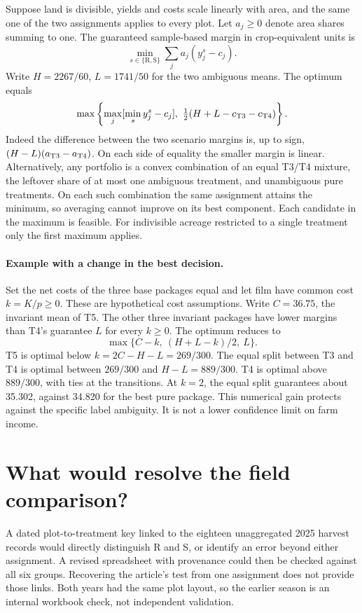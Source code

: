 \documentclass[11pt]{article}
\begin{document}
Suppose land is divisible, yields and costs scale linearly with area, and the same one of the two assignments applies to every plot. Let $a_j\geq0$ denote area shares summing to one. The guaranteed sample-based margin in crop-equivalent units is
\[
 \min_{s\in\{\mathrm R,\mathrm S\}}\sum_j a_j(y_j^s-c_j).
\]
Write $H=2267/60$, $L=1741/50$ for the two ambiguous means. The optimum equals
\[
 \max\left\{\max_j [\min_s y_j^s-c_j],\
              \tfrac12(H+L-c_{\rm T3}-c_{\rm T4})\right\}.
\]
Indeed the difference between the two scenario margins is, up to sign, $(H-L)(a_{\rm T3}-a_{\rm T4})$. On each side of equality the smaller margin is linear. Alternatively, any portfolio is a convex combination of an equal T3/T4 mixture, the leftover share of at most one ambiguous treatment, and unambiguous pure treatments. On each such combination the same assignment attains the minimum, so averaging cannot improve on its best component. Each candidate in the maximum is feasible. For indivisible acreage restricted to a single treatment only the first maximum applies.

\paragraph{Example with a change in the best decision.} Set the net costs of the three base packages equal and let film have common cost $k=K/p\geq0$. These are hypothetical cost assumptions. Write $C=36.75$, the invariant mean of T5. The other three invariant packages have lower margins than T4's guarantee $L$ for every $k\ge0$. The optimum reduces to
\[
   \max\{ C-k,\ (H+L-k)/2,\ L\}.
\]
T5 is optimal below $k=2C-H-L=269/300$. The equal split between T3 and T4 is optimal between $269/300$ and $H-L=889/300$. T4 is optimal above $889/300$, with ties at the transitions. At $k=2$, the equal split guarantees about 35.302, against 34.820 for the best pure package. This numerical gain protects against the specific label ambiguity. It is not a lower confidence limit on farm income.

\newpage
\section{What would resolve the field comparison?}
A dated plot-to-treatment key linked to the eighteen unaggregated 2025 harvest records would directly distinguish R and S, or identify an error beyond either assignment. A revised spreadsheet with provenance could then be checked against all six groups. Recovering the article's test from one assignment does not provide those links. Both years had the same plot layout, so the earlier season is an internal workbook check, not independent validation.
\end{document}
